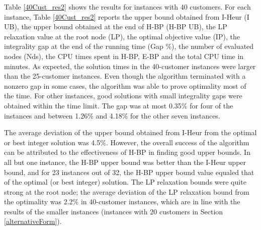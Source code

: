 Table \ref{40Cust_res2} shows the results for instances  with 40 customers.
For each instance, Table \ref{40Cust_res2} reports the upper bound obtained from
I-Heur (I UB), the upper bound obtained at the end of H-BP (H-BP UB),
the LP relaxation value at the root node (LP), the optimal objective value (IP),
the integrality gap at the end of the running time (Gap \%), the number of evaluated
nodes (Nds), the CPU times spent in H-BP, E-BP and the total CPU time in minutes.
As expected,
the solution times in the 40-customer instances were larger than the 25-customer instances.
Even though the algorithm terminated with a nonzero gap in some cases,
the algorithm was able to prove optimality most of the time.
For other instances, good solutions with small integrality gaps were obtained
within the time limit.  The gap was at most 0.35\% for four of the instances and between
1.26\% and 4.18\% for the other seven instances.

The average deviation of the upper bound obtained from I-Heur from the optimal or best integer
solution was 4.5\%. However, the overall success of the algorithm can be
attributed to the effectiveness of H-BP in finding good upper bounds. In all but one
instance, the H-BP upper bound was better than the I-Heur upper bound, and for 23 instances
out of 32, the H-BP upper bound value equaled that of the optimal (or best integer) solution.
The LP relaxation bounds were quite strong at the root node; the average deviation of the
LP relaxation bound from the optimality was 2.2\% in 40-customer instances, which are in line with
the results of the smaller instances (instances with 20 customers in Section \ref{alternativeForm}).

